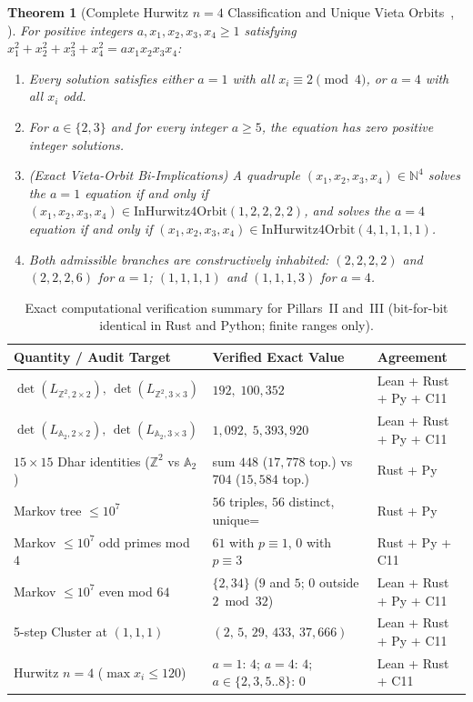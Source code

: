 \documentclass[11pt,reqno]{amsart}
\theoremstyle{plain}
\newtheorem{theorem}{Theorem}[section]
\theoremstyle{definition}
\newcommand{\ZZ}{\mathbb{Z}}
\newcommand{\NN}{\mathbb{N}}
\newcommand{\code}[1]{\texttt{\detokenize{#1}}}
\begin{document}
\begin{theorem}[Complete Hurwitz $n=4$ Classification and Unique Vieta Orbits~\cite{hurwitz1907}, \code{T3e}]
\label{thm:t3e}
For positive integers $a, x_1, x_2, x_3, x_4 \ge 1$ satisfying $x_1^2+x_2^2+x_3^2+x_4^2 = a x_1 x_2 x_3 x_4$:
\begin{enumerate}[leftmargin=1.8em, itemsep=1pt]
  \item Every solution satisfies either $a = 1$ with all $x_i \equiv 2 \pmod 4$, or $a = 4$ with all $x_i$ odd.
  \item For $a \in \{2, 3\}$ and for every integer $a \ge 5$, the equation has zero positive integer solutions.
  \item \emph{(Exact Vieta-Orbit Bi-Implications)} A quadruple $(x_1,x_2,x_3,x_4) \in \NN^4$ solves the $a=1$ equation \emph{if and only if} $(x_1,x_2,x_3,x_4) \in \mathrm{InHurwitz4Orbit}(1, 2, 2, 2, 2)$, and solves the $a=4$ equation \emph{if and only if} $(x_1,x_2,x_3,x_4) \in \mathrm{InHurwitz4Orbit}(4, 1, 1, 1, 1)$.
  \item Both admissible branches are constructively inhabited: $(2,2,2,2)$ and $(2,2,2,6)$ for $a=1$; $(1,1,1,1)$ and $(1,1,1,3)$ for $a=4$.
\end{enumerate}
\end{theorem}

\begin{table}[t]
\centering
\caption{Exact computational verification summary for Pillars~II and~III (bit-for-bit identical in Rust and Python; finite ranges only).}
\label{tab:pillar3}
\footnotesize
\begin{tabularx}{\textwidth}{@{}lXl@{}}
\toprule
\textbf{Quantity / Audit Target} & \textbf{Verified Exact Value} & \textbf{Agreement} \\
\midrule
$\det(L_{\ZZ^2, 2\times 2}),\, \det(L_{\ZZ^2, 3\times 3})$ & $192,\; 100{,}352$ & Lean + Rust + Py + C11 \\
$\det(L_{\mathbb{A}_2, 2\times 2}),\, \det(L_{\mathbb{A}_2, 3\times 3})$ & $1{,}092,\; 5{,}393{,}920$ & Lean + Rust + Py + C11 \\
$15\times 15$ Dhar identities ($\ZZ^2$ vs $\mathbb{A}_2$) & sum $448$ ($17{,}778$ top.) vs $704$ ($15{,}584$ top.) & Rust + Py \\
Markov tree $\le 10^7$ & $56$ triples, $56$ distinct, unique=\code{true} & Rust + Py \\
Markov $\le 10^7$ odd primes mod $4$ & $61$ with $p\equiv 1$, $0$ with $p\equiv 3$ & Rust + Py + C11 \\
Markov $\le 10^7$ even mod $64$ & $\{2, 34\}$ ($9$ and $5$; $0$ outside $2\bmod 32$) & Lean + Rust + Py + C11 \\
5-step Cluster at $(1,1,1)$ & $(2,\, 5,\, 29,\, 433,\, 37{,}666)$ & Lean + Rust + Py + C11 \\
Hurwitz $n=4$ ($\max x_i \le 120$) & $a{=}1$: $4$;\; $a{=}4$: $4$;\; $a\in\{2,3,5..8\}$: $0$ & Lean + Rust + C11 \\
\bottomrule
\end{tabularx}
\end{table}
\end{document}
